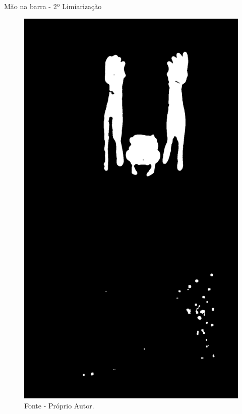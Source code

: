 \begin{frame}{Mão na barra - 2º Limiarização}
    \begin{figure}[!ht]
    \centering
    \includegraphics[scale=0.1]{img/desenvolvimento/maoBarra/limited2.png}
    \caption*{Fonte - Próprio Autor.}
    \end{figure}
\end{frame}

